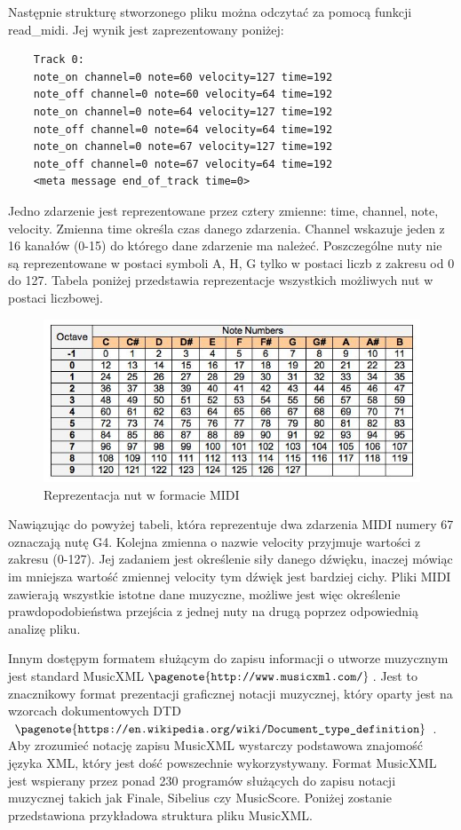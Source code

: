 Następnie strukturę stworzonego pliku można odczytać za pomocą funkcji read\_midi. Jej wynik jest zaprezentowany poniżej:

\begin{lstlisting}
	Track 0: 
	note_on channel=0 note=60 velocity=127 time=192
	note_off channel=0 note=60 velocity=64 time=192
	note_on channel=0 note=64 velocity=127 time=192
	note_off channel=0 note=64 velocity=64 time=192
	note_on channel=0 note=67 velocity=127 time=192
	note_off channel=0 note=67 velocity=64 time=192
	<meta message end_of_track time=0>
\end{lstlisting}

Jedno zdarzenie jest reprezentowane przez cztery zmienne: time, channel, note, velocity. Zmienna time określa czas danego zdarzenia. Channel wskazuje jeden z 16 kanałów (0-15) do którego dane zdarzenie ma należeć. Poszczególne nuty nie są reprezentowane w postaci symboli A, H, G tylko w postaci liczb z zakresu od 0 do 127. Tabela poniżej przedstawia reprezentacje wszystkich możliwych nut w postaci liczbowej.
\begin{figure}[H]
	\centering
	\includegraphics[width=0.7\linewidth]{nutymidi.jpg}
	\caption{Reprezentacja nut w formacie MIDI}
	\label{fig:fwxnbxgh4afzwe7}
\end{figure}

Nawiązując do powyżej tabeli, która reprezentuje dwa zdarzenia MIDI numery 67 oznaczają nutę G4. Kolejna zmienna o nazwie velocity przyjmuje wartości z zakresu (0-127). Jej zadaniem jest określenie siły danego dźwięku, inaczej mówiąc im mniejsza wartość zmiennej velocity tym dźwięk jest bardziej cichy. Pliki MIDI zawierają wszystkie istotne dane muzyczne, możliwe jest więc określenie prawdopodobieństwa przejścia z jednej nuty na drugą poprzez odpowiednią analizę pliku.

Innym dostępym formatem służącym do zapisu informacji o utworze muzycznym jest standard MusicXML$\pagenote{\texttt{http://www.musicxml.com/}}$. Jest to znacznikowy format prezentacji graficznej notacji muzycznej, który oparty jest na wzorcach dokumentowych DTD$\pagenote{\texttt{https://en.wikipedia.org/wiki/Document\_type\_definition}}$. Aby zrozumieć notację zapisu MusicXML wystarczy podstawowa znajomość języka XML, który jest dość powszechnie wykorzystywany. Format MusicXML jest wspierany przez ponad 230 programów służących do zapisu notacji muzycznej takich jak Finale, Sibelius czy MusicScore. Poniżej zostanie przedstawiona przykładowa struktura pliku MusicXML.


